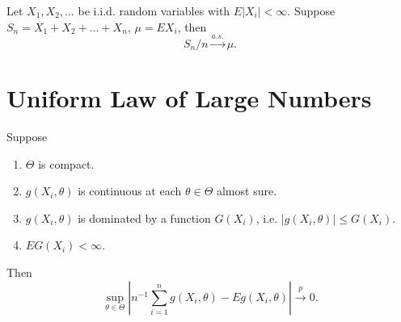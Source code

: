 \begin{theorem} \label{thm:SLLN}
    Let $X_1,X_2,\ldots$ be i.i.d. random variables with $E|X_i|<\infty$. Suppose $S_n=X_1+X_2+\ldots+X_n$, $\mu=EX_i$, then
    \begin{equation}
        S_n/n\stackrel{a.s.}{\rightarrow}\mu.
    \end{equation}
\end{theorem}

\section{Uniform Law of Large Numbers}

\begin{theorem} \label{thm:ULLN}
    Suppose
    \begin{enumerate}
        \item $\Theta$ is compact.
        \item $g\left(X_{i},\theta\right)$ is continuous at each $\theta\in\Theta$ almost sure.
        \item $g\left(X_{i},\theta\right)$ is dominated by a function $G\left(X_{i}\right)$, i.e. $\left|g\left(X_{i},\theta\right)\right|\leq G\left(X_{i}\right)$.
        \item $EG\left(X_{i}\right)<\infty$.
    \end{enumerate}
    Then
    \begin{equation}
        \sup_{\theta\in\Theta}\left|n^{-1}\sum_{i=1}^{n}g\left(X_{i},\theta\right)-Eg\left(X_{i},\theta\right)\right|\stackrel{p}{\rightarrow}0.
    \end{equation}
\end{theorem}

